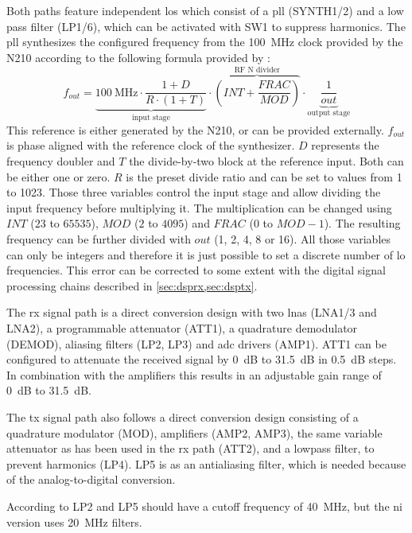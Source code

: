 \documentclass[12pt,a4paper,parskip=full,abstracton]{scrartcl}
\begin{document}
Both paths feature independent \glspl{lo} which consist of a \gls{pll} (SYNTH1/2) and a low
pass filter (LP1/6), which can be activated with SW1 to suppress harmonics\cite{flo}. The
\gls{pll} synthesizes the configured frequency from the \SI{100}{\mega\hertz} clock provided
by the N210 according to the following formula provided by \cite{synth}:
\begin{equation}
\label{eq:frequency}
f_{out} = \underbrace{\SI{100}{\mega\hertz} \cdot \frac{1 + D}{R \cdot (1 + T)}}_\text{input stage} \cdot \overbrace{\left(INT + \frac{FRAC}{MOD}\right)}^\text{RF N divider} \cdot \underbrace{\frac{1}{out}}_\text{output stage}
\end{equation}
This reference is either generated by the N210, or can be provided externally.
$f_{out}$ is phase aligned with the reference clock of the synthesizer. $D$ represents the frequency doubler
and $T$ the divide-by-two block at the reference input. Both can
be either one or zero. $R$ is the preset divide ratio and can be set to values from 1 to 1023.
Those three variables control the input stage and allow dividing the input frequency before multiplying
it. The multiplication can be changed using $INT$ ($23$ to $65535$), $MOD$ ($2$ to $4095$)
and $FRAC$ (0 to $MOD - 1$). The resulting frequency can be further divided with $out$ (1, 2, 4, 8 or 16).
All those variables can only be integers and therefore it is just possible to set a discrete number of
\gls{lo} frequencies. This error can be corrected to some extent with the digital signal
processing chains described in \cref{sec:dsprx,sec:dsptx}.

The \gls{rx} signal path is a direct conversion design with two \glspl{lna} (LNA1/3 and LNA2),
a programmable attenuator (ATT1), a quadrature demodulator (DEMOD), aliasing filters (LP2, LP3)
and \gls{adc} drivers (AMP1). ATT1 can be configured to attenuate the received signal by
\SI{0}{\deci\bel} to \SI{31.5}{\deci\bel} in \SI{0.5}{\deci\bel} steps. In combination with
the amplifiers this results in an adjustable gain range of \SI{0}{\deci\bel} to \SI{31.5}{\deci\bel}.

The \gls{tx} signal path also follows a direct conversion design consisting of a quadrature
modulator (MOD), amplifiers (AMP2, AMP3), the same variable attenuator as has been used in
the \gls{rx} path (ATT2), and a lowpass filter, to prevent harmonics (LP4). LP5 is as an
antialiasing filter, which is needed because of the analog-to-digital conversion.

According to \cite{sch_sbx} LP2 and LP5 should have a cutoff frequency of \SI{40}{\mega\hertz},
but the \gls{ni} version uses \SI{20}{\mega\hertz} filters\cite{ni_29xx}.
\end{document}
